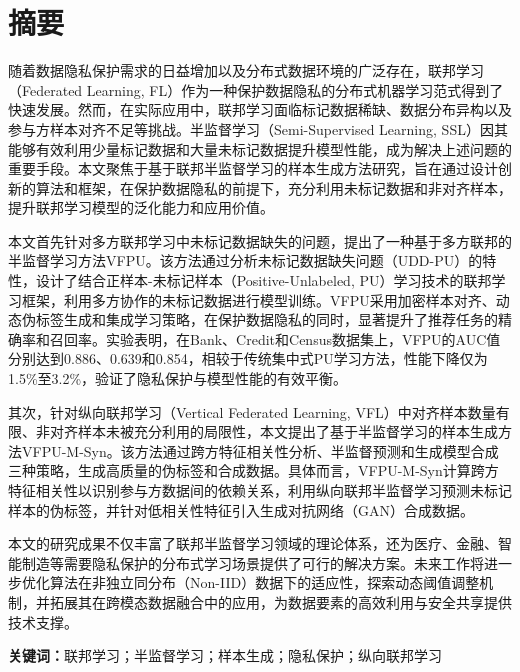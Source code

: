 


\chapter{摘\quad 要}
\xiaosi

随着数据隐私保护需求的日益增加以及分布式数据环境的广泛存在，联邦学习（Federated Learning, FL）作为一种保护数据隐私的分布式机器学习范式得到了快速发展。然而，在实际应用中，联邦学习面临标记数据稀缺、数据分布异构以及参与方样本对齐不足等挑战。半监督学习（Semi-Supervised Learning, SSL）因其能够有效利用少量标记数据和大量未标记数据提升模型性能，成为解决上述问题的重要手段。本文聚焦于基于联邦半监督学习的样本生成方法研究，旨在通过设计创新的算法和框架，在保护数据隐私的前提下，充分利用未标记数据和非对齐样本，提升联邦学习模型的泛化能力和应用价值。  

本文首先针对多方联邦学习中未标记数据缺失的问题，提出了一种基于多方联邦的半监督学习方法VFPU。该方法通过分析未标记数据缺失问题（UDD-PU）的特性，设计了结合正样本-未标记样本（Positive-Unlabeled, PU）学习技术的联邦学习框架，利用多方协作的未标记数据进行模型训练。VFPU采用加密样本对齐、动态伪标签生成和集成学习策略，在保护数据隐私的同时，显著提升了推荐任务的精确率和召回率。实验表明，在Bank、Credit和Census数据集上，VFPU的AUC值分别达到0.886、0.639和0.854，相较于传统集中式PU学习方法，性能下降仅为1.5\%至3.2\%，验证了隐私保护与模型性能的有效平衡。  

其次，针对纵向联邦学习（Vertical Federated Learning, VFL）中对齐样本数量有限、非对齐样本未被充分利用的局限性，本文提出了基于半监督学习的样本生成方法VFPU-M-Syn。该方法通过跨方特征相关性分析、半监督预测和生成模型合成三种策略，生成高质量的伪标签和合成数据。具体而言，VFPU-M-Syn计算跨方特征相关性以识别参与方数据间的依赖关系，利用纵向联邦半监督学习预测未标记样本的伪标签，并针对低相关性特征引入生成对抗网络（GAN）合成数据。 

本文的研究成果不仅丰富了联邦半监督学习领域的理论体系，还为医疗、金融、智能制造等需要隐私保护的分布式学习场景提供了可行的解决方案。未来工作将进一步优化算法在非独立同分布（Non-IID）数据下的适应性，探索动态阈值调整机制，并拓展其在跨模态数据融合中的应用，为数据要素的高效利用与安全共享提供技术支撑。
  
\noindent\songti\textbf{关键词：}联邦学习；半监督学习；样本生成；隐私保护；纵向联邦学习

\clearpage